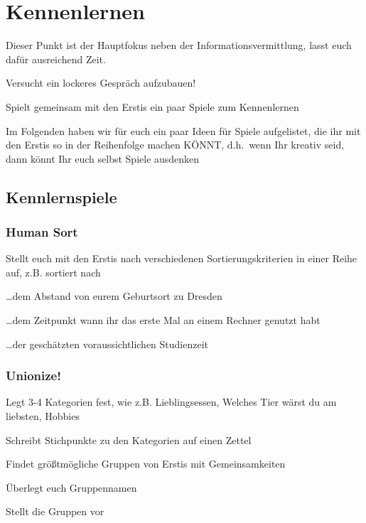\documentclass[a4paper,12pt]{scrreprt}
\begin{document}
\section{Kennenlernen}
\begin{itemize*}
    \item Dieser Punkt ist der Hauptfokus neben der Informationsvermittlung, lasst euch dafür ausreichend Zeit.
    \item Versucht ein lockeres Gespräch aufzubauen!
    \item Spielt gemeinsam mit den Erstis ein paar Spiele zum Kennenlernen
    \item Im Folgenden haben wir für euch ein paar Ideen für Spiele aufgelistet, die ihr mit den Erstis so in der Reihenfolge machen KÖNNT, d.h.\ wenn Ihr kreativ seid, dann könnt Ihr euch selbst Spiele ausdenken
\end{itemize*}


\subsection{Kennlernspiele}

\subsubsection{Human Sort}
\begin{itemize*}
    \item Stellt euch mit den Erstis nach verschiedenen Sortierungskriterien in einer Reihe auf, z.B. sortiert nach
    \item \dots dem Abstand von eurem Geburtsort zu Dresden
    \item \dots dem Zeitpunkt wann ihr das erste Mal an einem Rechner genutzt habt
    \item \dots der geschätzten voraussichtlichen Studienzeit
\end{itemize*}

\subsubsection{Unionize!}
\begin{itemize*}
    \item Legt 3-4 Kategorien fest, wie z.B. Lieblingsessen, Welches Tier wärst du am liebsten, Hobbies
    \item Schreibt Stichpunkte zu den Kategorien auf einen Zettel
    \item Findet größtmögliche Gruppen von Erstis mit Gemeinsamkeiten
    \item Überlegt euch Gruppennamen
    \item Stellt die Gruppen vor
\end{itemize*}
\end{document}
